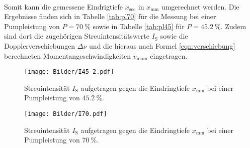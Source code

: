 \\Somit kann die gemessene Eindrigtiefe $x_\mathrm{sec}$ in $x_\mathrm{mm}$ umgerechnet werden. Die Ergebnisse finden sich in Tabelle \ref{tab:pl70} für die Messung bei einer Pumpleistung von $P=\SI{70}{\percent}$ sowie in Tabelle  \ref{tab:pl45} für $P=\SI{45.2}{\percent}$.
Zudem sind dort die zugehörigen Streuintensitätswerte $I_\mathrm{S}$ sowie die Dopplerverschiebungen $\Delta \nu$ und die hieraus nach Formel \eqref{eqn:verschiebung} berechneten Momentangeschwindigkeiten $v_\mathrm{mom}$ eingetragen.

\begin{figure}
  \centering
  \texttt{[image: Bilder/I45-2.pdf]}
  \caption{Streuintensität $I_\mathrm{S}$ aufgetragen gegen die Eindringtiefe $x_\mathrm{mm}$ bei einer Pumpleistung von $\SI{45.2}{\percent}$. }
  \label{fig:I45}
\end{figure}
\begin{figure}
  \centering
  \texttt{[image: Bilder/I70.pdf]}
  \caption{Streuintensität $I_\mathrm{S}$ aufgetragen gegen die Eindringtiefe $x_\mathrm{mm}$ bei einer Pumpleistung von $\SI{70}{\percent}$. }
  \label{fig:I70}
\end{figure}

